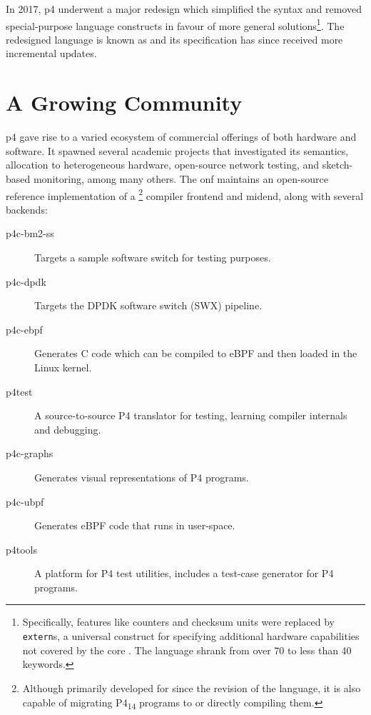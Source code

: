 In 2017, \acrshort{p4} underwent a major redesign\cite{p416} which simplified
the syntax and removed special-purpose language constructs in favour of more
general solutions\footnote{Specifically, features like counters and checksum
units were replaced by \texttt{extern}s, a universal construct for specifying
additional hardware capabilities not covered by the core . The language shrank from over 70 to less than 40
keywords.\cite{p416:v1:spec:comparison}}. The redesigned language is known as
\pfs\cite{p416:v123:spec} and its specification has since received more
incremental updates.

\section*{A Growing Community}

\acrshort{p4} gave rise to a varied ecosystem of commercial offerings of both
hardware and software. It spawned several academic projects that investigated
its semantics\cite{doenges2021petr4}, allocation to heterogeneous
hardware\cite{sultana2021flightplan}, open-source network
testing\cite{antichi2014osnt}, and sketch-based
monitoring\cite{namkung2022sketchlib}, among many
others\cite{liatifis2023advancingp4survey}. The \acrfull{onf}
maintains\cite{p4onf} an open-source reference implementation of a
\pfs\footnote{Although primarily developed for \pfs since the revision of the
language, it is also capable of migrating P4\textsubscript{14} programs to \pfs
or directly compiling them.} compiler frontend and mid\-end, along with several
backends:

\begin{description}
	\item[p4c-bm2-ss] Targets a sample software switch for testing purposes.
	\item[p4c-dpdk] Targets the DPDK software switch (SWX) pipeline\cite{dpdkDPDKRelease}.
	\item[p4c-ebpf] Generates C code which can be compiled to eBPF
		and then loaded in the Linux kernel.
	\item[p4test] A source-to-source P4 translator for testing, learning compiler
		internals and debugging.
	\item[p4c-graphs] Generates visual representations of P4 programs.
	\item[p4c-ubpf] Generates eBPF code that runs in user-space.
	\item[p4tools] A platform for P4 test utilities, includes a test-case
		generator for P4 programs.
\end{description}

